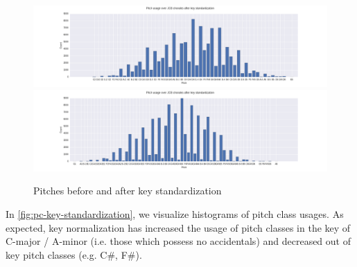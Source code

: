 \documentclass[dissertation.tex]{subfiles}
\begin{document}
\begin{figure}[htpb]
    \centering
    \includegraphics[width=1.0\linewidth]{Figures/pitch-usage-original.png}
    \includegraphics[width=1.0\linewidth]{Figures/pitch-usage-preproc.png}
    \caption{Pitches before and after key standardization}
    \label{fig:pitch-key-standardization}
\end{figure}

In \autoref{fig:pc-key-standardization}, we visualize histograms of pitch class usages.
As expected, key normalization has increased the usage of pitch classes in the key of
C-major / A-minor (i.e. those which possess no accidentals) and decreased out of key
pitch classes (e.g. C\#, F\#).
\end{document}
